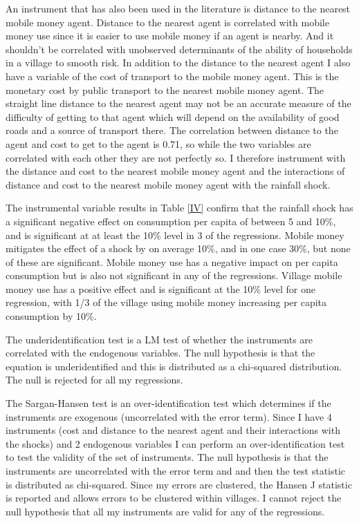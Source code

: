 An instrument that has also been used in the literature is distance to the nearest mobile money agent. Distance to the nearest agent is correlated with mobile money use since it is easier to use mobile money if an agent is nearby. And it shouldn't be correlated with unobserved determinants of the ability of households in a village to smooth risk. In addition to the distance to the nearest agent I also have a variable of the cost of transport to the mobile money agent. This is the monetary cost by public transport to the nearest mobile money agent. The straight line distance to the nearest agent may not be an accurate measure of the difficulty of getting to that agent which will depend on the availability of good roads and a source of transport there. The correlation between distance to the agent and cost to get to the agent is 0.71, so while the two variables are correlated with each other they are not perfectly so. I therefore instrument with the distance and cost to the nearest mobile money agent and the interactions of distance and cost to the nearest mobile money agent with the rainfall shock. 



The instrumental variable results in Table \ref{IV} confirm that the rainfall shock has a significant negative effect on consumption per capita of between 5 and 10\%, and is significant at at least the 10\% level in 3 of the regressions. Mobile money mitigates the effect of a shock by on average 10\%, and in one case 30\%, but none of these are significant. Mobile money use has a negative impact on per capita consumption  but is also not significant in any of the regressions. Village mobile money use has a positive effect and is significant at the 10\% level for one regression, with 1/3 of the village using mobile money increasing per capita consumption by 10\%. 


The underidentification test is a LM test of whether the instruments are correlated with the endogenous variables. The null hypothesis is that the equation is underidentified and this is distributed as a chi-squared distribution. The null is rejected for all my regressions. 

The Sargan-Hansen test is an over-identification test which determines if the instruments are exogenous (uncorrelated with the error term). Since I have 4 instruments (cost and distance to the nearest agent and their interactions with the shocks) and 2 endogenous variables I can perform an over-identification test to test the validity of the set of instruments. The null hypothesis is that the instruments are uncorrelated with the error term and and then the test statistic is distributed as chi-squared. Since my errors are clustered, the Hansen J statistic is reported and allows errors to be clustered within villages. I cannot reject the null hypothesis that all my instruments are valid for any of the regressions. 

